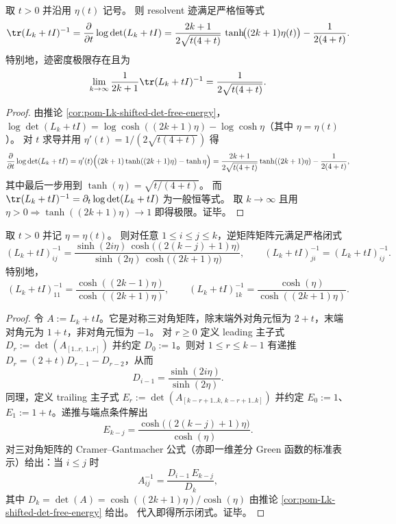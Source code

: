 \begin{corollary}\label{cor:pom-Lk-resolvent-trace-hyperbolic}
取 \(t>0\) 并沿用 \(\eta(t)\) 记号。
则 resolvent 迹满足严格恒等式
\[
\tr(L_k+tI)^{-1}
=\frac{\partial}{\partial t}\log\det(L_k+tI)
=\frac{2k+1}{2\sqrt{t(4+t)}}\,\tanh\!\bigl((2k+1)\eta(t)\bigr)-\frac{1}{2(4+t)}.
\]
特别地，迹密度极限存在且为
\[
\lim_{k\to\infty}\frac{1}{2k+1}\tr(L_k+tI)^{-1}
=\frac{1}{2\sqrt{t(4+t)}}.
\]
\end{corollary}
\begin{proof}
由推论 \ref{cor:pom-Lk-shifted-det-free-energy}，
\(
\log\det(L_k+tI)=\log\cosh((2k+1)\eta)-\log\cosh\eta
\)（其中 \(\eta=\eta(t)\)）。
对 \(t\) 求导并用 \(\eta'(t)=1/(2\sqrt{t(4+t)})\) 得
\[
\frac{\partial}{\partial t}\log\det(L_k+tI)
=\eta'(t)\Bigl((2k+1)\tanh((2k+1)\eta)-\tanh\eta\Bigr)
=\frac{2k+1}{2\sqrt{t(4+t)}}\tanh((2k+1)\eta)-\frac{1}{2(4+t)},
\]
其中最后一步用到 \(\tanh(\eta)=\sqrt{t/(4+t)}\)。
而 \(\tr(L_k+tI)^{-1}=\partial_t\log\det(L_k+tI)\) 为一般恒等式。
取 \(k\to\infty\) 且用 \(\eta>0\Rightarrow\tanh((2k+1)\eta)\to 1\) 即得极限。证毕。
\end{proof}

\begin{proposition}\label{prop:pom-Lk-green-kernel-entries}
取 \(t>0\) 并记 \(\eta=\eta(t)\)。
则对任意 \(1\le i\le j\le k\)，逆矩阵矩阵元满足严格闭式
\[
(L_k+tI)^{-1}_{ij}
=\frac{\sinh(2i\eta)\,\cosh\!\bigl((2(k-j)+1)\eta\bigr)}
{\sinh(2\eta)\,\cosh\!\bigl((2k+1)\eta\bigr)},
\qquad
(L_k+tI)^{-1}_{ji}=(L_k+tI)^{-1}_{ij}.
\]
特别地，
\[
(L_k+tI)^{-1}_{11}=\frac{\cosh((2k-1)\eta)}{\cosh((2k+1)\eta)},
\qquad
(L_k+tI)^{-1}_{1k}=\frac{\cosh(\eta)}{\cosh((2k+1)\eta)}.
\]
\end{proposition}
\begin{proof}
令 \(A:=L_k+tI\)。它是对称三对角矩阵，除末端外对角元恒为 \(2+t\)，末端对角元为 \(1+t\)，非对角元恒为 \(-1\)。
对 \(r\ge 0\) 定义 leading 主子式
\(
D_r:=\det(A_{[1..r,\,1..r]})
\)
并约定 \(D_0:=1\)。则对 \(1\le r\le k-1\) 有递推 \(D_r=(2+t)D_{r-1}-D_{r-2}\)，从而
\[
D_{i-1}=\frac{\sinh(2i\eta)}{\sinh(2\eta)}.
\]
同理，定义 trailing 主子式
\(
E_r:=\det(A_{[k-r+1..k,\,k-r+1..k]})
\)
并约定 \(E_0:=1\)、\(E_1:=1+t\)。递推与端点条件解出
\[
E_{k-j}=\frac{\cosh\!\bigl((2(k-j)+1)\eta\bigr)}{\cosh(\eta)}.
\]
对三对角矩阵的 Cramer--Gantmacher 公式（亦即一维差分 Green 函数的标准表示）给出：当 \(i\le j\) 时
\[
A^{-1}_{ij}=\frac{D_{i-1}\,E_{k-j}}{D_k},
\]
其中 \(D_k=\det(A)=\cosh((2k+1)\eta)/\cosh(\eta)\) 由推论 \ref{cor:pom-Lk-shifted-det-free-energy} 给出。
代入即得所示闭式。证毕。
\end{proof}

